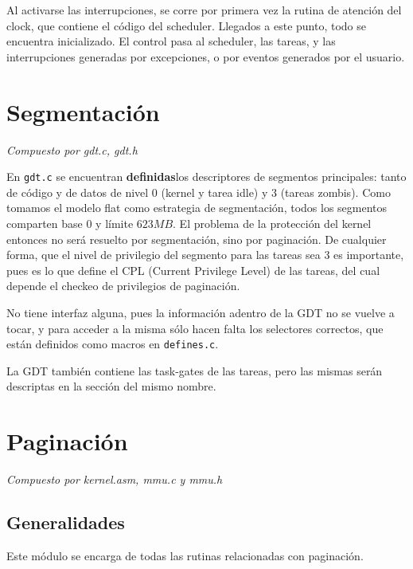 \documentclass{article}
\begin{document}
	Al activarse las interrupciones, se corre por primera vez la rutina de atención del clock, que contiene el código del scheduler. Llegados a este punto, todo se encuentra inicializado. El control pasa al scheduler, las tareas, y las interrupciones generadas por excepciones, o por eventos generados por el usuario.


	\section{Segmentación}
	\vspace{-1cm}	
	\begin{flushright}
	\textit{Compuesto por gdt.c, gdt.h}
	\end{flushright}
	
	En \texttt{gdt.c} se encuentran \textbf{definidas}los descriptores de segmentos principales: tanto de código y de datos de nivel 0 (kernel y tarea idle) y 3 (tareas zombis). Como tomamos el modelo flat como estrategia de segmentación, todos los segmentos comparten base $0$ y límite $623MB$. El problema de la protección del kernel entonces no será resuelto por segmentación, sino por paginación. De cualquier forma, que el nivel de privilegio del segmento para las tareas sea 3 es importante, pues es lo que define el CPL (Current Privilege Level) de las tareas, del cual depende el checkeo de privilegios de paginación.
	
	No tiene interfaz alguna, pues la información adentro de la GDT no se vuelve a tocar, y para acceder a la misma sólo hacen falta los selectores correctos, que están definidos como macros en \texttt{defines.c}.
	
	La GDT también contiene las task-gates de las tareas, pero las mismas serán descriptas en la sección del mismo nombre.

	
	\section{Paginación}
	\vspace{-1cm}	
	\begin{flushright}
	\textit{Compuesto por kernel.asm, mmu.c y mmu.h}
	\end{flushright}

	\subsection*{Generalidades}
	
	Este módulo se encarga de todas las rutinas relacionadas con paginación.
	
\end{document}
